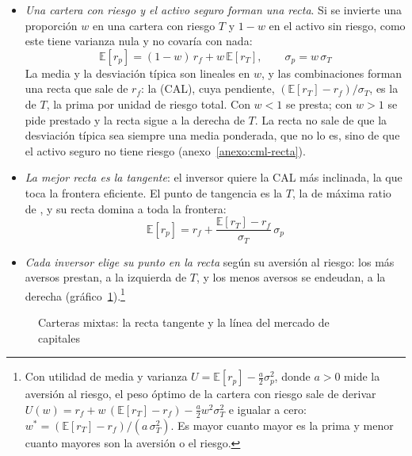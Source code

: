\documentclass[11pt]{article}
\begin{document}
\begin{itemize}
\item \emph{Una cartera con riesgo y el activo seguro forman una recta}. Si se invierte una proporción $w$ en una cartera con riesgo $T$ y $1-w$ en el activo sin riesgo, como este tiene varianza nula y no covaría con nada:
  \begin{equation}\label{eq:cal}
  \mathbb{E}[r_p]=(1-w)\,r_f+w\,\mathbb{E}[r_T],\qquad \sigma_p=w\,\sigma_T
  \end{equation}
  La media y la desviación típica son lineales en $w$, y las combinaciones forman una recta que sale de $r_f$: la  (CAL), cuya pendiente, $(\mathbb{E}[r_T]-r_f)/\sigma_T$, es la  de $T$, la prima por unidad de riesgo total. Con $w<1$ se presta; con $w>1$ se pide prestado y la recta sigue a la derecha de $T$. La recta no sale de que la desviación típica sea siempre una media ponderada, que no lo es, sino de que el activo seguro no tiene riesgo (anexo~\ref{anexo:cml-recta}).
\item \emph{La mejor recta es la tangente}: el inversor quiere la CAL más inclinada, la que toca la frontera eficiente. El punto de tangencia es la  $T$, la de máxima ratio de , y su recta domina a toda la frontera:
  \begin{equation}\label{eq:cml}
  \mathbb{E}[r_p]=r_f+\frac{\mathbb{E}[r_T]-r_f}{\sigma_T}\,\sigma_p
  \end{equation}
\item \emph{Cada inversor elige su punto en la recta} según su aversión al riesgo: los más aversos prestan, a la izquierda de $T$, y los menos aversos se endeudan, a la derecha (gráfico~\ref{fig:cml}).\footnote{Con utilidad de media y varianza $U=\mathbb{E}[r_p]-\tfrac{a}{2}\sigma_p^2$, donde $a>0$ mide la aversión al riesgo, el peso óptimo de la cartera con riesgo sale de derivar $U(w)=r_f+w\,(\mathbb{E}[r_T]-r_f)-\tfrac{a}{2}w^2\sigma_T^2$ e igualar a cero: $w^*=(\mathbb{E}[r_T]-r_f)/(a\,\sigma_T^2)$. Es mayor cuanto mayor es la prima y menor cuanto mayores son la aversión o el riesgo\nocite{BodieKaneMarcus2021Investments}.}
\end{itemize}
\begin{figure}[H]
\centering
\caption{Carteras mixtas: la recta tangente y la línea del mercado de capitales}\label{fig:cml}
\end{figure}
\end{document}
